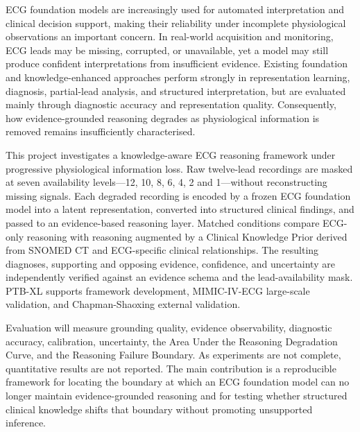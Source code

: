 \documentclass{ssnreview}
\begin{document}
\makereviewtitle
\reviewfrontmatter

\begin{reviewabstract}
ECG foundation models are increasingly used for automated interpretation and clinical
decision support, making their reliability under incomplete physiological observations an
important concern. In real-world acquisition and monitoring, ECG leads may be missing,
corrupted, or unavailable, yet a model may still produce confident interpretations from
insufficient evidence. Existing foundation and knowledge-enhanced approaches perform
strongly in representation learning, diagnosis, partial-lead analysis, and structured
interpretation, but are evaluated mainly through diagnostic accuracy and representation
quality. Consequently, how evidence-grounded reasoning degrades as physiological
information is removed remains insufficiently characterised.

This project investigates a knowledge-aware ECG reasoning framework under progressive
physiological information loss. Raw twelve-lead recordings are masked at seven availability
levels---12, 10, 8, 6, 4, 2 and 1---without reconstructing missing signals. Each degraded
recording is encoded by a frozen ECG foundation model into a latent representation,
converted into structured clinical findings, and passed to an evidence-based reasoning layer.
Matched conditions compare ECG-only reasoning with reasoning augmented by a Clinical
Knowledge Prior derived from SNOMED CT and ECG-specific clinical relationships.
The resulting diagnoses, supporting and opposing evidence, confidence, and uncertainty
are independently verified against an evidence schema and the lead-availability mask.
PTB-XL supports framework development, MIMIC-IV-ECG large-scale validation, and
Chapman-Shaoxing external validation.

Evaluation will measure grounding quality, evidence observability, diagnostic accuracy,
calibration, uncertainty, the Area Under the Reasoning Degradation Curve, and the
Reasoning Failure Boundary. As experiments are not complete, quantitative results
are not reported. The main contribution is a reproducible framework for locating the
boundary at which an ECG foundation model can no longer maintain evidence-grounded
reasoning and for testing whether structured clinical knowledge shifts that boundary
without promoting unsupported inference.

\end{reviewabstract}
\end{document}
